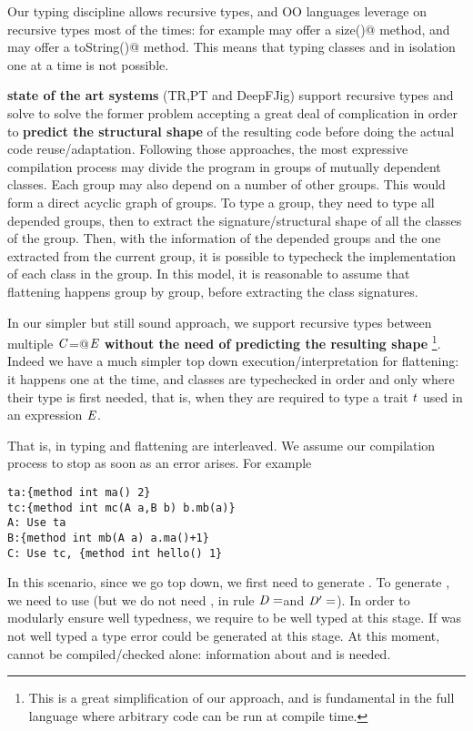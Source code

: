 Our typing discipline allows recursive types, and
OO languages leverage on recursive types most of the times:
for example \Q@String@ may offer a \Q@Int size()@
method, and \Q@Int@ may offer a \Q@String toString()@ method.
This means that typing classes 
\Q@String@ and \Q@Int@ in isolation one at a time is not possible.

\textbf{state of the art systems} (TR,PT and DeepFJig)
support recursive types and solve to solve the former problem  accepting a great deal of
complication in order to \textbf{predict the structural shape} of the resulting code before doing the actual
code reuse/adaptation.
Following those approaches, 
the most expressive compilation process may divide the program in groups of mutually 
dependent classes.
Each group may also depend on a number of other groups.
This would form a direct acyclic graph of groups.
To type a group, they need to type all depended groups, then
to extract the signature/structural shape of all
the classes of the group.
Then, with the information of the depended groups and the one extracted
from the current group, it is possible to typecheck the implementation
 of each class in the group.
In this model, it is reasonable to assume that flattening happens group by group, before
extracting the class signatures.

In our simpler but still sound approach,
we support recursive types between multiple $\mathit{C}$\Q@=@$\mathit{E}$ \textbf{without
the need of predicting the resulting shape}%
\footnote{This is a great simplification of our approach,
and is fundamental in the full language where arbitrary code can be run at compile time.}.
Indeed we have a much simpler top down execution/interpretation for flattening:
it happens one at the time, and classes are typechecked 
in order and only where their type is first needed,
that is, when they are required to type a trait $\mathit{t}$ used in an expression $\mathit{E}$.

That is, in \name typing and flattening are interleaved. We assume our compilation process to stop as soon as 
an error arises. 
For example
\saveSpace\begin{lstlisting}
ta:{method int ma() 2}
tc:{method int mc(A a,B b) b.mb(a)}
A: Use ta
B:{method int mb(A a) a.ma()+1}
C: Use tc, {method int hello() 1}
\end{lstlisting}\saveSpace
In this scenario, since we go top down, we first need to generate \Q@A@.
To generate \Q@A@, we need to use \Q@ta@ (but we do not need
\Q@tc@, in rule  $\mathit{D}=$\Q@ta@ and $\mathit{D}'=$\Q@tc@).
In order to modularly ensure well typedness,
we require \Q@ta@ to be well typed at this stage. If \Q@ta@ was not well typed
a type error could be generated at this stage.
At this moment, \Q@tc@ cannot be compiled/checked alone:
information about \Q@A@ and \Q@B@ is needed.

